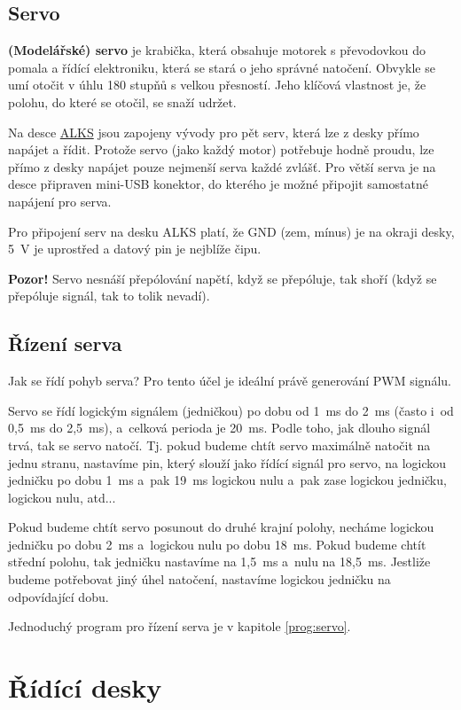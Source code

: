 \label{servo} \subsection{Servo}

{\bf (Modelářské) servo} je krabička, která obsahuje motorek s převodovkou do pomala a řídící elektroniku, která se stará o jeho správné natočení. Obvykle se umí otočit v úhlu 180 stupňů s velkou přesností. Jeho klíčová vlastnost je, že polohu, do které se otočil, se snaží udržet.  

Na desce \hyperref[alks]{ALKS} jsou zapojeny vývody pro pět serv, která lze z desky přímo napájet a řídit. 
Protože servo (jako každý motor) potřebuje hodně proudu, lze přímo z desky napájet pouze nejmenší serva každé zvlášť. Pro větší serva je na desce připraven mini-USB konektor, do kterého je možné připojit samostatné napájení pro serva. 

Pro připojení serv na desku ALKS platí, že GND (zem, mínus) je na okraji desky, 5~V je uprostřed a datový pin je nejblíže čipu. 

{\bf Pozor!} Servo nesnáší přepólování napětí, když se přepóluje, tak shoří (když se přepóluje signál, tak to tolik nevadí).

\subsection{Řízení serva}

 Jak se řídí pohyb serva? Pro tento účel je ideální právě generování PWM signálu. 

Servo se řídí logickým signálem (jedničkou) po dobu od 1~ms do 2~ms (často i~od 0,5~ms do 2,5~ms), 
a~celková perioda je 20~ms. Podle toho, jak dlouho signál trvá, tak se servo natočí. 
Tj. pokud budeme chtít servo maximálně natočit na jednu stranu, nastavíme pin, který 
slouží jako řídící signál pro servo, na logickou jedničku po dobu 1~ms a~pak 19~ms logickou nulu a~pak zase logickou jedničku, logickou nulu, atd... 

Pokud budeme chtít servo posunout do druhé krajní polohy, necháme logickou jedničku po dobu 2~ms a~logickou nulu po dobu 18~ms. 
Pokud budeme chtít střední polohu, tak jedničku nastavíme na 1,5~ms a~nulu na 18,5~ms. 
Jestliže budeme potřebovat jiný úhel natočení, nastavíme logickou jedničku na odpovídající dobu.

Jednoduchý program pro řízení serva je v kapitole \ref{prog:servo}.


\section{Řídící desky}

